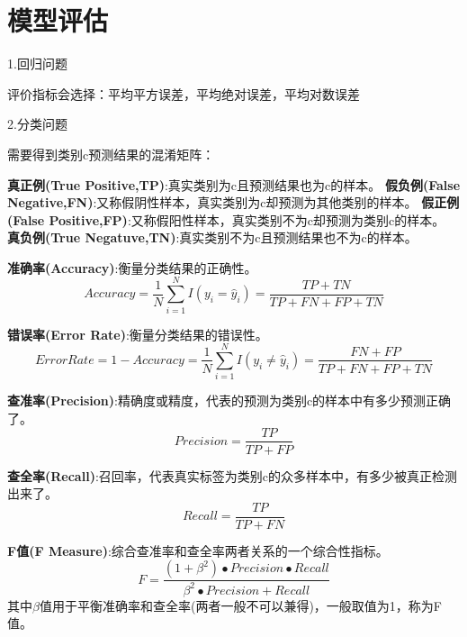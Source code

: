 \documentclass[openbib]{article}
\begin{document}
\section{模型评估}
\begin{center}
	1.回归问题
\end{center}
评价指标会选择：平均平方误差，平均绝对误差，平均对数误差
\begin{center}
	2.分类问题
\end{center}
需要得到类别c预测结果的混淆矩阵：
\begin{table}[htbp]
	\centering
\end{table}
\textbf{真正例(True Positive,TP)}:真实类别为c且预测结果也为c的样本。
\textbf{假负例(False Negative,FN)}:又称假阴性样本，真实类别为c却预测为其他类别的样本。
\textbf{假正例(False Positive,FP)}:又称假阳性样本，真实类别不为c却预测为类别c的样本。
\textbf{真负例(True Negatuve,TN)}:真实类别不为c且预测结果也不为c的样本。

\textbf{准确率(Accuracy)}:衡量分类结果的正确性。
$$Accuracy=\frac{1}{N}\sum_{i=1}^{N}I(y_i=\hat{y}_i)=\frac{TP+TN}{TP+FN+FP+TN}$$

\textbf{错误率(Error Rate)}:衡量分类结果的错误性。
$$ErrorRate=1-Accuracy=\frac{1}{N}\sum_{i=1}^{N}I(y_i\neq \hat{y}_i)=\frac{FN+FP}{TP+FN+FP+TN}$$

\textbf{查准率(Precision)}:精确度或精度，代表的预测为类别c的样本中有多少预测正确了。
$$Precision = \frac{TP}{TP+FP}$$

\textbf{查全率(Recall)}:召回率，代表真实标签为类别c的众多样本中，有多少被真正检测出来了。
$$Recall = \frac{TP}{TP+FN}$$

\textbf{F值(F Measure)}:综合查准率和查全率两者关系的一个综合性指标。
$$F=\frac{(1+\beta^2)\bullet Precision\bullet Recall}{\beta^2 \bullet Precision + Recall}$$
其中$\beta$值用于平衡准确率和查全率(两者一般不可以兼得)，一般取值为1，称为F值。
\end{document}

